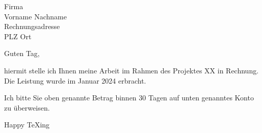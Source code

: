 \documentclass[parskip=half-,german]{scrartcl}
\begin{document}
\begin{letter}{Firma\\Vorname Nachname\\Rechnungsadresse\\PLZ Ort}
	
\opening{Guten Tag,}

hiermit stelle ich Ihnen meine Arbeit im Rahmen des Projektes XX in Rechnung. Die Leistung wurde im Januar 2024 erbracht. 


\PrintInvoiceTabular

Ich bitte Sie oben genannte Betrag binnen 30 Tagen auf unten genanntes Konto zu überweisen.

\closing{Happy \TeX{}ing}


\end{letter}
\end{document}

